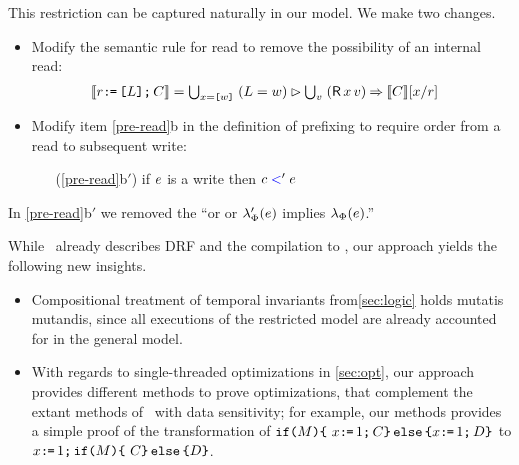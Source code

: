 This restriction can be captured naturally in our model.  We make two changes.
\begin{itemize}
\item Modify the semantic rule for read to remove the possibility of an internal read:
  \begin{align*}
    \sem{\aReg\GETS\REF{\cExp}\SEMI \aCmd} & =
    \textstyle\bigcup_{\aLoc=\REF{\bVal}}\; ({\cExp}=\bVal) \guard \textstyle\bigcup_\aVal\; (\DR\aLoc\aVal) \prefix \sem{\aCmd}[\aLoc/\aReg] 
  \end{align*}
\item Modify item \ref{pre-read}b in the definition of prefixing to require
  order from a read to subsequent write:
  \begin{enumerate}
  \item[(\ref{pre-read}b$'$)] if $e$ is a write then  $c\mathrel{{\color{blue}<}}'e$ 
  \end{enumerate}
\end{itemize}
In \ref{pre-read}b$'$ we removed the ``or or $\lambda_{\Phi}'(e)$ implies
$\lambda_{\Phi}(e)$.''

While~\citet{Dolan:2018:BDR:3192366.3192421} already describes DRF and  the compilation to \armeight, our approach yields the following new insights.
\begin{itemize}
\item Compositional treatment of temporal invariants from\textsection\ref{sec:logic} holds mutatis mutandis, since all executions of the restricted model are already accounted for in the general model.

\item With regards to single-threaded optimizations in \textsection\ref{sec:opt}, our approach provides different methods to prove optimizations, that complement the extant methods of~\citet{Dolan:2018:BDR:3192366.3192421} with data sensitivity; for example, our methods provides a simple proof of  the transformation of $
\texttt{if}\allowbreak\texttt{(}M\texttt{)}\allowbreak\texttt{\{}\ x \texttt{:}\mkern-1mu\texttt{=}\, 1 \texttt{;}\, C \texttt{\}}\,\allowbreak\texttt{else}\allowbreak\,\texttt{\{} x\texttt{:}\mkern-1mu\texttt{=}\, 1 \texttt{;}\, D\texttt{\}}$ to 
$x \texttt{:}\mkern-1mu\texttt{=}\, 1 \texttt{;}\, \texttt{if}\allowbreak\texttt{(}M\texttt{)}\allowbreak\texttt{\{}\  C \texttt{\}}\,\allowbreak\texttt{else}\allowbreak\,\texttt{\{}  D\texttt{\}}$.

\end{itemize}

